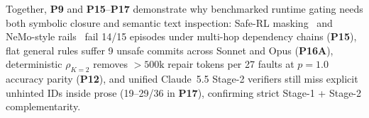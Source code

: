 Together, \textbf{P9} and \textbf{P15}--\textbf{P17} demonstrate why benchmarked runtime gating needs both symbolic closure and semantic text inspection: Safe-RL masking~\cite{alshiekh2018shield} and NeMo-style rails~\cite{rebedea2023nemo} fail 14/15 episodes under multi-hop dependency chains (\textbf{P15}), flat general rules suffer 9 unsafe commits across Sonnet and Opus (\textbf{P16A}), deterministic $\rho_{K=2}$ removes $>500\text{k}$ repair tokens per 27 faults at $p{=}1.0$ accuracy parity (\textbf{P12}), and unified Claude~5.5 Stage-2 verifiers still miss explicit unhinted IDs inside prose (19--29/36 in \textbf{P17}), confirming strict Stage-1 + Stage-2 complementarity.
